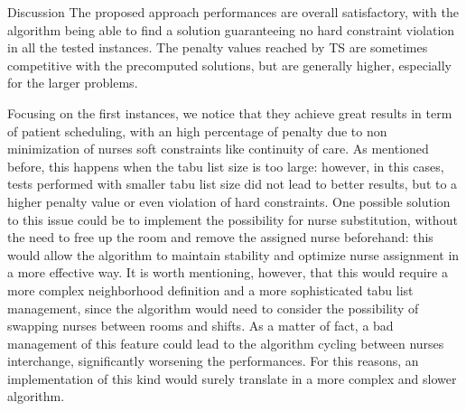 \begin{section}
 {Discussion}
 The proposed approach performances are overall satisfactory, with the algorithm being able to find a solution
 guaranteeing no hard constraint violation in all the tested instances. The penalty values reached by TS
 are sometimes competitive with the precomputed solutions, but are generally higher, especially for the
 larger problems.

 Focusing on the first instances, we notice that they achieve great results in term of patient scheduling,
 with an high percentage of penalty due to
 non minimization of nurses soft constraints like continuity of care. As mentioned before, this happens
 when the tabu list size is too large: however, in this cases, tests performed with smaller tabu list size
 did not lead to better results, but to a higher penalty value or even violation of hard constraints.
 One possible solution to this issue could be to implement the possibility for nurse substitution,
 without the need to free up the room and remove the assigned nurse beforehand: this would allow the algorithm
 to maintain stability and optimize nurse assignment in a more effective way. It is worth mentioning, however,
 that this would require a more complex neighborhood definition and a more sophisticated tabu list management,
 since the algorithm would need to consider the possibility of swapping nurses between rooms and shifts.
 As a matter of fact, a bad management of this feature could lead to the algorithm cycling between nurses interchange,
 significantly worsening the performances.
 For this reasons, an implementation of this kind would surely translate in a more complex and slower algorithm.

\end{section}